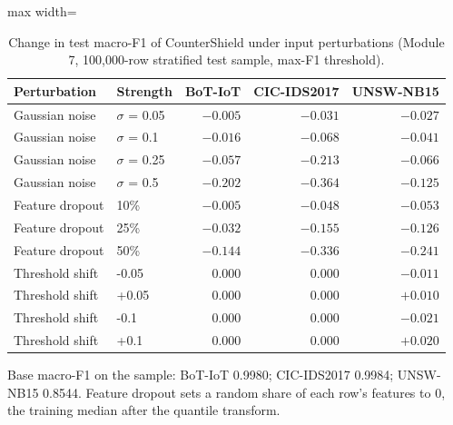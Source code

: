 \begin{table}[t]
\centering
\caption{Change in test macro-F1 of CounterShield under input perturbations (Module 7, 100,000-row stratified test sample, max-F1 threshold).}
\label{tab:robustness}
\footnotesize
\setlength{\tabcolsep}{3.5pt}
\begin{adjustbox}{max width=\linewidth}
\begin{tabular}{llrrr}
\toprule
Perturbation & Strength & BoT-IoT & CIC-IDS2017 & UNSW-NB15 \\
\midrule
Gaussian noise & $\sigma$ = 0.05 & $-0.005$ & $-0.031$ & $-0.027$ \\
Gaussian noise & $\sigma$ = 0.1 & $-0.016$ & $-0.068$ & $-0.041$ \\
Gaussian noise & $\sigma$ = 0.25 & $-0.057$ & $-0.213$ & $-0.066$ \\
Gaussian noise & $\sigma$ = 0.5 & $-0.202$ & $-0.364$ & $-0.125$ \\
\midrule
Feature dropout & 10\% & $-0.005$ & $-0.048$ & $-0.053$ \\
Feature dropout & 25\% & $-0.032$ & $-0.155$ & $-0.126$ \\
Feature dropout & 50\% & $-0.144$ & $-0.336$ & $-0.241$ \\
\midrule
Threshold shift & -0.05 & $0.000$ & $0.000$ & $-0.011$ \\
Threshold shift & +0.05 & $0.000$ & $0.000$ & $+0.010$ \\
Threshold shift & -0.1 & $0.000$ & $0.000$ & $-0.021$ \\
Threshold shift & +0.1 & $0.000$ & $0.000$ & $+0.020$ \\
\bottomrule
\end{tabular}
\end{adjustbox}
\par\vspace{2pt}
\parbox{0.98\linewidth}{\scriptsize Base macro-F1 on the sample: BoT-IoT 0.9980; CIC-IDS2017 0.9984; UNSW-NB15 0.8544. Feature dropout sets a random share of each row's features to 0, the training median after the quantile transform.}
\end{table}
